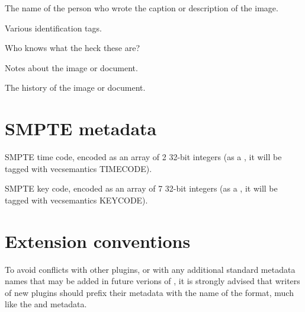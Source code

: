 The name of the person who wrote the caption or description of the image.
\apiend

Various identification tags.
\apiend

Who knows what the heck these are?
\apiend

Notes about the image or document.
\apiend

The history of the image or document.
\apiend


\section{SMPTE metadata}
\label{sec:metadata:smpte}

SMPTE time code, encoded as an array of 2 32-bit integers (as a
\TypeDesc, it will be tagged with vecsemantics {\cf TIMECODE}).
\apiend

SMPTE key code, encoded as an array of 7 32-bit integers (as a
\TypeDesc, it will be tagged with vecsemantics {\cf KEYCODE}).
\apiend




\section{Extension conventions}

To avoid conflicts with other plugins, or with any additional standard
metadata names that may be added in future verions of \product, it is
strongly advised that writers of new plugins should prefix their
metadata with the name of the format, much like the 
and  metadata.


\chapwidthend
